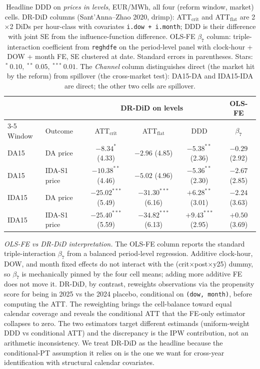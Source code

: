 \documentclass[11pt,a4paper]{article}
\newcommand{\code}[1]{\nolinkurl{#1}}
\begin{document}
\begin{table}[H]
\centering\footnotesize
\setlength{\tabcolsep}{4pt}
\caption{Headline DDD on \emph{prices in levels}, EUR/MWh, all four (reform window, market) cells. DR-DiD columns (Sant'Anna--Zhao 2020, drimp): ATT$_{\text{crit}}$ and ATT$_{\text{flat}}$ are 2$\times$2 DiDs per hour-class with covariates \code{i.dow + i.month}; DDD is their difference with joint SE from the influence-function difference. OLS-FE $\beta_7$ column: triple-interaction coefficient from \code{reghdfe} on the period-level panel with clock-hour + DOW + month FE, SE clustered at date. Standard errors in parentheses. Stars: $^{*}~0.10,~^{**}~0.05,~^{***}~0.01$. The \emph{Channel} column distinguishes direct (the market hit by the reform) from spillover (the cross-market test): DA15-DA and IDA15-IDA are direct; the other two cells are spillover.}
\label{tab:reform_ddd_summary}
\begin{tabular}{llcccc}
\toprule
& & \multicolumn{3}{c}{DR-DiD on levels} & OLS-FE \\
\cmidrule(lr){3-5}
Window & Outcome & ATT$_{\text{crit}}$ & ATT$_{\text{flat}}$ & DDD & $\beta_7$ \\
\midrule
DA15  & DA price        & $-8.34^{*}$ \scriptsize{(4.33)}    & $-2.96$ \scriptsize{(4.85)}     & $-5.38^{**}$ \scriptsize{(2.36)}  & $-0.29$ \scriptsize{(2.92)} \\
DA15  & IDA-S1 price    & $-10.38^{**}$ \scriptsize{(4.46)}  & $-5.02$ \scriptsize{(4.96)}     & $-5.36^{**}$ \scriptsize{(2.30)}  & $-2.67$ \scriptsize{(2.85)} \\
IDA15 & DA price        & $-25.02^{***}$ \scriptsize{(5.49)} & $-31.30^{***}$ \scriptsize{(6.16)} & $+6.28^{**}$ \scriptsize{(3.01)}  & $-2.24$ \scriptsize{(3.63)} \\
IDA15 & IDA-S1 price    & $-25.40^{***}$ \scriptsize{(5.59)} & $-34.82^{***}$ \scriptsize{(6.13)} & $+9.43^{***}$ \scriptsize{(2.95)} & $+0.50$ \scriptsize{(3.69)} \\
\bottomrule
\end{tabular}
\end{table}

\textit{OLS-FE vs DR-DiD interpretation.} The OLS-FE column reports the standard triple-interaction $\beta_7$ from a balanced period-level regression. Additive clock-hour, DOW, and month fixed effects do not interact with the (crit$\times$post$\times$y25) dummy, so $\beta_7$ is mechanically pinned by the four cell means; adding more additive FE does not move it. DR-DiD, by contrast, reweights observations via the propensity score for being in 2025 vs the 2024 placebo, conditional on \texttt{(dow, month)}, before computing the ATT. The reweighting brings the cell-balance toward equal calendar coverage and reveals the conditional ATT that the FE-only estimator collapses to zero. The two estimators target different estimands (uniform-weight DDD vs conditional ATT) and the discrepancy is the IPW contribution, not an arithmetic inconsistency. We treat DR-DiD as the headline because the conditional-PT assumption it relies on is the one we want for cross-year identification with structural calendar covariates.
\end{document}
